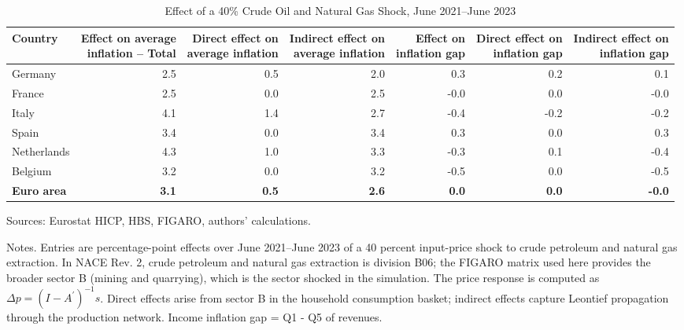 \begin{table}[H]
\centering
\caption{Effect of a 40\% Crude Oil and Natural Gas Shock, June 2021--June 2023}
\scriptsize
\setlength{\tabcolsep}{4.2pt}
\begin{tabular}{lrrrrrr}
\toprule
Country & \shortstack{Effect on average\\inflation -- Total} & \shortstack{Direct effect on\\average inflation} & \shortstack{Indirect effect on\\average inflation} & \shortstack{Effect on\\inflation gap} & \shortstack{Direct effect on\\inflation gap} & \shortstack{Indirect effect on\\inflation gap}
 \\
\midrule
Germany & 2.5 & 0.5 & 2.0 & 0.3 & 0.2 & 0.1
 \\
France & 2.5 & 0.0 & 2.5 & -0.0 & 0.0 & -0.0
 \\
Italy & 4.1 & 1.4 & 2.7 & -0.4 & -0.2 & -0.2
 \\
Spain & 3.4 & 0.0 & 3.4 & 0.3 & 0.0 & 0.3
 \\
Netherlands & 4.3 & 1.0 & 3.3 & -0.3 & 0.1 & -0.4
 \\
Belgium & 3.2 & 0.0 & 3.2 & -0.5 & 0.0 & -0.5
 \\
\midrule
\textbf{Euro area} & \textbf{3.1} & \textbf{0.5} & \textbf{2.6} & \textbf{0.0} & \textbf{0.0} & \textbf{-0.0}
 \\
\bottomrule
\end{tabular}
\par\vspace{0.35em}\footnotesize\noindent Sources: Eurostat HICP, HBS, FIGARO, authors' calculations.
\par\vspace{0.25em}\footnotesize\noindent Notes. Entries are percentage-point effects over June 2021--June 2023 of a 40 percent input-price shock to crude petroleum and natural gas extraction. In NACE Rev. 2, crude petroleum and natural gas extraction is division B06; the FIGARO matrix used here provides the broader sector B (mining and quarrying), which is the sector shocked in the simulation. The price response is computed as $\Delta p = (I - A^{\prime})^{-1}s$. Direct effects arise from sector B in the household consumption basket; indirect effects capture Leontief propagation through the production network. Income inflation gap = Q1 - Q5 of revenues.
\end{table}
\vspace{0.6em}
